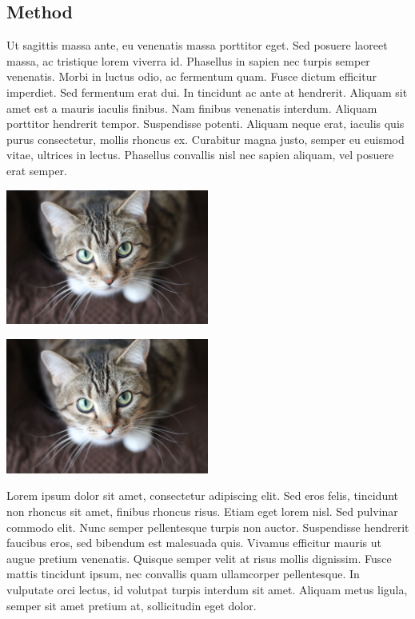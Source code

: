 \documentclass{OP-Whitepaper}
\begin{document}
\begin{multicols}{2}

\section{Method}

Ut sagittis massa ante, eu venenatis massa porttitor eget. Sed posuere laoreet massa, ac tristique lorem viverra id. Phasellus in sapien nec turpis semper venenatis. Morbi in luctus odio, ac fermentum quam. Fusce dictum efficitur imperdiet. Sed fermentum erat dui. In tincidunt ac ante at hendrerit. Aliquam sit amet est a mauris iaculis finibus. Nam finibus venenatis interdum. Aliquam porttitor hendrerit tempor. Suspendisse potenti. Aliquam neque erat, iaculis quis purus consectetur, mollis rhoncus ex. Curabitur magna justo, semper eu euismod vitae, ultrices in lectus. Phasellus convallis nisl nec sapien aliquam, vel posuere erat semper. 



\begin{Figure}
    \centering
    \label{fig:cat1}
    \includegraphics[width=0.5\textwidth]{cat.jpg}
\end{Figure}

\begin{Figure}
    \centering
    \label{fig:cat2}
    \includegraphics[width=0.5\textwidth]{cat.jpg}
\end{Figure}

Lorem ipsum dolor sit amet, consectetur adipiscing elit. Sed eros felis, tincidunt non rhoncus sit amet, finibus rhoncus risus. Etiam eget lorem nisl. Sed pulvinar commodo elit. Nunc semper pellentesque turpis non auctor. Suspendisse hendrerit faucibus eros, sed bibendum est malesuada quis. Vivamus efficitur mauris ut augue pretium venenatis. Quisque semper velit at risus mollis dignissim. Fusce mattis tincidunt ipsum, nec convallis quam ullamcorper pellentesque. In vulputate orci lectus, id volutpat turpis interdum sit amet. Aliquam metus ligula, semper sit amet pretium at, sollicitudin eget dolor.\cite{Alani-2012}


\end{multicols}
\end{document}
